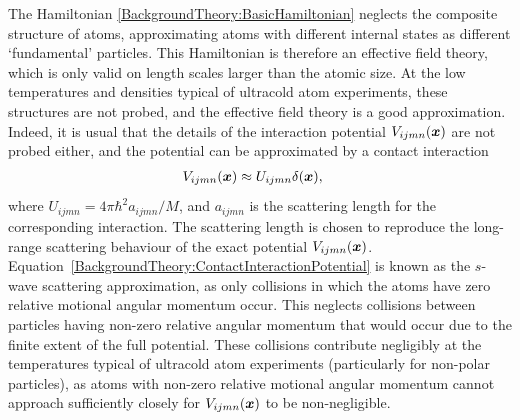The Hamiltonian \eqref{BackgroundTheory:BasicHamiltonian} neglects the composite structure of atoms, approximating atoms with different internal states as different `fundamental' particles.  This Hamiltonian is therefore an effective field theory, which is only valid on length scales larger than the atomic size.  At the low temperatures and densities typical of ultracold atom experiments, these structures are not probed, and the effective field theory is a good approximation.  Indeed, it is usual that the details of the interaction potential $V_{ijmn}(\bm{x})$ are not probed either, and the potential can be approximated by a contact interaction \citep{Leggett:2001}
\begin{align}
    V_{ijmn}(\vect{x}) &\approx U_{ijmn} \delta(\vect{x}), \label{BackgroundTheory:ContactInteractionPotential}
\end{align}
where $U_{ijmn} = 4 \pi \hbar^2 a_{ijmn}/M$, and $a_{ijmn}$ is the scattering length for the corresponding interaction.  The scattering length is chosen to reproduce the long-range scattering behaviour of the exact potential $V_{ijmn}(\bm{x})$.  Equation~\eqref{BackgroundTheory:ContactInteractionPotential} is known as the $s$-wave scattering approximation, as only collisions in which the atoms have zero relative motional angular momentum occur.  This neglects collisions between particles having non-zero relative angular momentum that would occur due to the finite extent of the full potential.  These collisions contribute negligibly at the temperatures typical of ultracold atom experiments (particularly for non-polar particles), as atoms with non-zero relative motional angular momentum cannot approach sufficiently closely for $V_{ijmn}(\bm{x})$ to be non-negligible.

